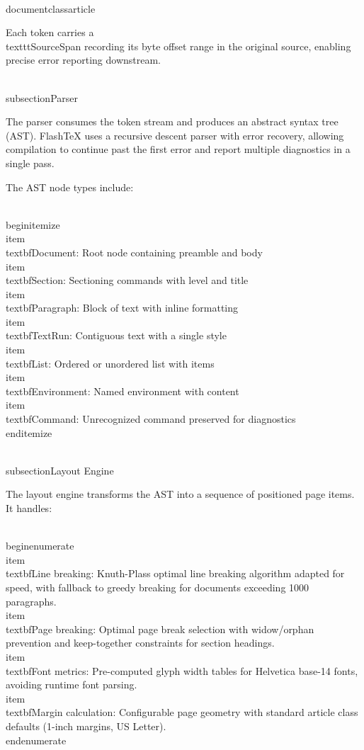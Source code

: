 \\documentclass{article}
\begin{document}
Each token carries a \\texttt{SourceSpan} recording its byte offset range
in the original source, enabling precise error reporting downstream.

\\subsection{Parser}

The parser consumes the token stream and produces an abstract syntax tree
(AST). FlashTeX uses a recursive descent parser with error recovery,
allowing compilation to continue past the first error and report multiple
diagnostics in a single pass.

The AST node types include:

\\begin{itemize}
  \\item \\textbf{Document}: Root node containing preamble and body
  \\item \\textbf{Section}: Sectioning commands with level and title
  \\item \\textbf{Paragraph}: Block of text with inline formatting
  \\item \\textbf{TextRun}: Contiguous text with a single style
  \\item \\textbf{List}: Ordered or unordered list with items
  \\item \\textbf{Environment}: Named environment with content
  \\item \\textbf{Command}: Unrecognized command preserved for diagnostics
\\end{itemize}

\\subsection{Layout Engine}

The layout engine transforms the AST into a sequence of positioned page
items. It handles:

\\begin{enumerate}
  \\item \\textbf{Line breaking}: Knuth-Plass optimal line breaking
    algorithm adapted for speed, with fallback to greedy breaking for
    documents exceeding 1000 paragraphs.
  \\item \\textbf{Page breaking}: Optimal page break selection with
    widow/orphan prevention and keep-together constraints for section
    headings.
  \\item \\textbf{Font metrics}: Pre-computed glyph width tables for
    Helvetica base-14 fonts, avoiding runtime font parsing.
  \\item \\textbf{Margin calculation}: Configurable page geometry with
    standard article class defaults (1-inch margins, US Letter).
\\end{enumerate}
\end{document}

